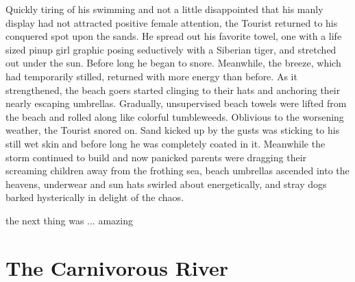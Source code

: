 \documentclass[10pt,twoside,openright]{memoir}
\begin{document}
Quickly tiring of his swimming and not a little disappointed that his manly display had not attracted positive female attention, the Tourist returned to his conquered spot upon the sands. He spread out his favorite towel, one with a life sized pinup girl graphic posing seductively with a Siberian tiger, and stretched out under the sun. Before long he began to snore. Meanwhile, the breeze, which had temporarily stilled, returned with more energy than before. As it strengthened, the beach goers started clinging to their hats and anchoring their nearly escaping umbrellas. Gradually, unsupervised beach towels were lifted from the beach and rolled along like colorful tumbleweeds. Oblivious to the worsening weather, the Tourist snored on. Sand kicked up by the gusts was sticking to his still wet skin and before long he was completely coated in it. Meanwhile the storm continued to build and now panicked parents were dragging their screaming children away from the frothing sea, beach umbrellas ascended into the heavens, underwear and sun hats swirled about energetically, and stray dogs barked hysterically in delight of the chaos.

the next thing was ... amazing



\chapter{The Carnivorous River}

\end{document}
